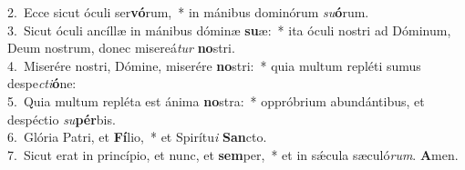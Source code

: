 {2.~}Ecce sicut óculi ser\textbf{vó}rum,~* in mánibus dominórum \textit{su}\textbf{ó}rum.\\
{3.~}Sicut óculi ancíllæ in mánibus dóminæ \textbf{su}æ:~* ita óculi nostri ad Dóminum, Deum nostrum, donec misereá\textit{tur} \textbf{no}stri.\\
{4.~}Miserére nostri, Dómine, miserére \textbf{no}stri:~* quia multum repléti sumus despe\textit{cti}\textbf{ó}ne:\\
{5.~}Quia multum repléta est ánima \textbf{no}stra:~* oppróbrium abundántibus, et despéctio \textit{su}\textbf{pér}bis.\\
{6.~}Glória Patri, et \textbf{Fí}lio,~* et Spirítu\textit{i} \textbf{San}cto.\\
{7.~}Sicut erat in princípio, et nunc, et \textbf{sem}per,~* et in sǽcula sæculó\textit{rum}. \textbf{A}men.\\
